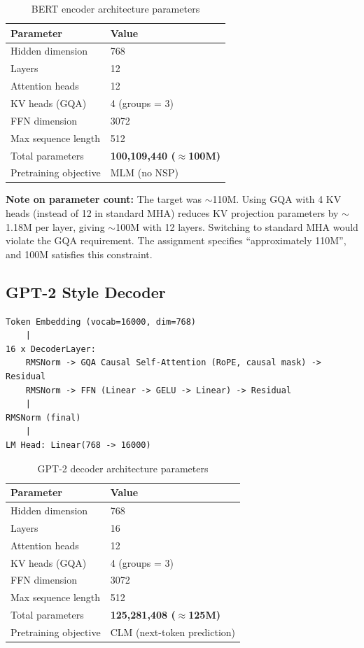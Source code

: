 \documentclass[12pt,a4paper]{article}
\begin{document}
\begin{table}[H]
\centering
\caption{BERT encoder architecture parameters}
\begin{tabular}{ll}
\toprule
\textbf{Parameter} & \textbf{Value} \\
\midrule
Hidden dimension & 768 \\
Layers & 12 \\
Attention heads & 12 \\
KV heads (GQA) & 4 (groups = 3) \\
FFN dimension & 3072 \\
Max sequence length & 512 \\
Total parameters & \textbf{100,109,440 ($\approx$100M)} \\
Pretraining objective & MLM (no NSP) \\
\bottomrule
\end{tabular}
\end{table}

\textbf{Note on parameter count:} The target was $\sim$110M. Using GQA with 4 KV heads (instead of 12 in standard MHA) reduces KV projection parameters by $\sim$1.18M per layer, giving $\sim$100M with 12 layers. Switching to standard MHA would violate the GQA requirement. The assignment specifies ``approximately 110M'', and 100M satisfies this constraint.

\subsection{GPT-2 Style Decoder}

\begin{lstlisting}[caption={GPT-2 decoder architecture}]
Token Embedding (vocab=16000, dim=768)
    |
16 x DecoderLayer:
    RMSNorm -> GQA Causal Self-Attention (RoPE, causal mask) -> Residual
    RMSNorm -> FFN (Linear -> GELU -> Linear) -> Residual
    |
RMSNorm (final)
    |
LM Head: Linear(768 -> 16000)
\end{lstlisting}

\begin{table}[H]
\centering
\caption{GPT-2 decoder architecture parameters}
\begin{tabular}{ll}
\toprule
\textbf{Parameter} & \textbf{Value} \\
\midrule
Hidden dimension & 768 \\
Layers & 16 \\
Attention heads & 12 \\
KV heads (GQA) & 4 (groups = 3) \\
FFN dimension & 3072 \\
Max sequence length & 512 \\
Total parameters & \textbf{125,281,408 ($\approx$125M)} \\
Pretraining objective & CLM (next-token prediction) \\
\bottomrule
\end{tabular}
\end{table}
\end{document}
